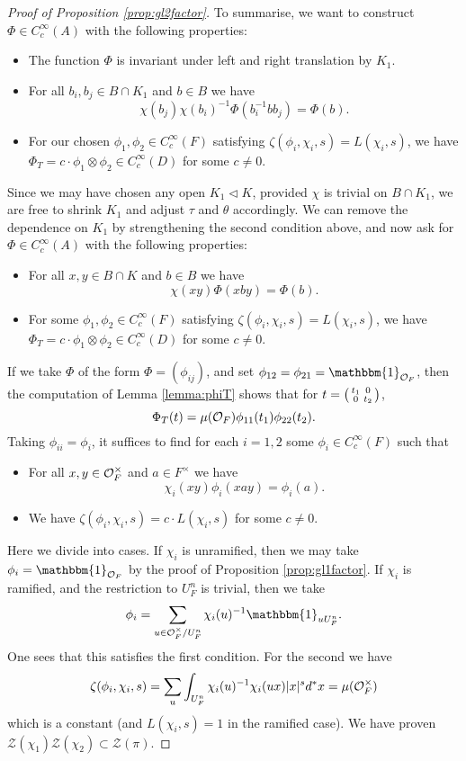 \begin{proof}[Proof of Proposition \ref{prop:gl2factor}]
    To summarise, we want to construct $\Phi \in C_c^\infty(A)$ with the following properties:
    \begin{itemize}
        \item The function $\Phi$ is invariant under left and right translation by $K_1$.
        \item For all $b_i,b_j \in B \cap K_1$ and $b \in B$ we have $$\chi(b_j)\chi(b_i)^{-1}\Phi(b_i^{-1}bb_j) = \Phi(b).$$
        \item For our chosen $\phi_1,\phi_2 \in C_c^\infty(F)$ satisfying $\zeta(\phi_i,\chi_i,s)=L(\chi_i,s)$, we have $\Phi_T = c \cdot \phi_1 \otimes \phi_2 \in C_c^\infty(D)$ for some $c \neq 0$.
    \end{itemize}
    Since we may have chosen any open $K_1 \lhd K$, provided $\chi$ is trivial on $B \cap K_1$, we are free to shrink $K_1$ and adjust $\tau$ and $\theta$ accordingly. We can remove the dependence on $K_1$ by strengthening the second condition above, and now ask for $\Phi \in C_c^\infty(A)$ with the following properties:
    \begin{itemize}
        \item For all $x,y \in B \cap K$ and $b \in B$ we have $$\chi(xy)\Phi(xby) = \Phi(b).$$
        \item For some $\phi_1,\phi_2 \in C_c^\infty(F)$ satisfying $\zeta(\phi_i,\chi_i,s)=L(\chi_i,s)$, we have $\Phi_T = c \cdot \phi_1 \otimes \phi_2 \in C_c^\infty(D)$ for some $c \neq 0$.
    \end{itemize}
    If we take $\Phi$ of the form $\Phi=(\phi_{ij})$, and set $\phi_{12}=\phi_{21}=\mathbbm{1}_{\mathcal O_F}$, then the computation of Lemma \ref{lemma:phiT} shows that for $t= \begin{psmallmatrix}
        t_1&0\\0&t_2
    \end{psmallmatrix}$,
    $$\Phi_T(t) = \mu(\mathcal{O}_F)\phi_{11}(t_1)\phi_{22}(t_2).$$
    Taking $\phi_{ii}=\phi_i$, it suffices to find for each $i=1,2$ some $\phi_i \in C_c^\infty(F)$ such that
    \begin{itemize}
        \item For all $x,y \in \mathcal{O}_F^\times$ and $a \in F^\times$ we have $$\chi_i(xy)\phi_i(xay) = \phi_i(a).$$
        \item We have $\zeta(\phi_i,\chi_i,s)=c \cdot L(\chi_i,s)$ for some $c \neq 0$.
    \end{itemize}
    Here we divide into cases. If $\chi_i$ is unramified, then we may take $\phi_i = \mathbbm{1}_{\cO_F}$ by the proof of Proposition \ref{prop:gl1factor}. If $\chi_i$ is ramified, and the restriction to $U_F^n$ is trivial, then we take 
    $$ \phi_i = \sum\limits_{u \in \cO_F^\times/U_F^n} \chi_i(u)^{-1} \mathbbm{1}_{uU_F^n}.$$ One sees that this satisfies the first condition. For the second we have 
    $$\zeta(\phi_i,\chi_i,s) = \sum\limits_u \int_{U_F^n} \chi_i(u)^{-1}\chi_i(ux)|x|^s d^*x = \mu(\mathcal{O}_F^\times)$$ which is a constant (and $L(\chi_i,s)=1$ in the ramified case). We have proven $\mathcal Z(\chi_1)\mathcal Z(\chi_2) \subset \mathcal Z(\pi)$.

\end{proof}

